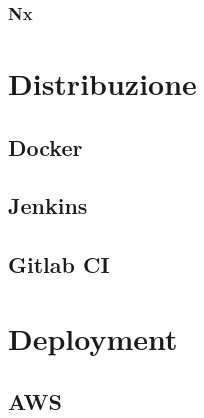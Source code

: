 \subsubsection{Nx}


\section{Distribuzione}
\subsection{Docker}

\subsection{Jenkins}

\subsection{Gitlab CI}


\section{Deployment}
\subsection{AWS}

